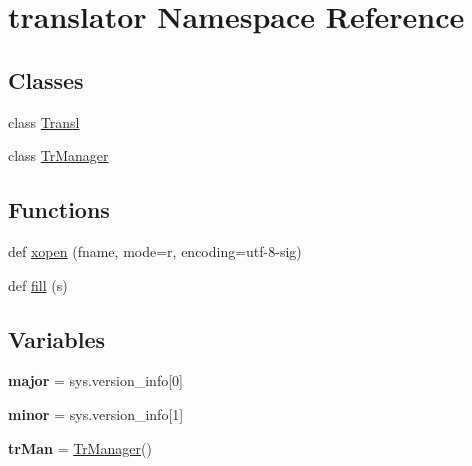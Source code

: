 \hypertarget{namespacetranslator}{}\section{translator Namespace Reference}
\label{namespacetranslator}
\subsection*{Classes}
\begin{DoxyCompactItemize}
\item 
class \mbox{\hyperlink{classtranslator_1_1_transl}{Transl}}
\item 
class \mbox{\hyperlink{classtranslator_1_1_tr_manager}{Tr\+Manager}}
\end{DoxyCompactItemize}
\subsection*{Functions}
\begin{DoxyCompactItemize}
\item 
def \mbox{\hyperlink{namespacetranslator_af67a3c62e84dd7699326522b41955c86}{xopen}} (fname, mode=\textquotesingle{}r\textquotesingle{}, encoding=\textquotesingle{}utf-\/8-\/sig\textquotesingle{})
\item 
def \mbox{\hyperlink{namespacetranslator_ab1f88f7e883aa197f4f24466397ca1bc}{fill}} (s)
\end{DoxyCompactItemize}
\subsection*{Variables}
\begin{DoxyCompactItemize}
\item 
\mbox{\label{namespacetranslator_a819a35a0f3635b885b2a397130b39605}} 
{\bfseries major} = sys.\+version\+\_\+info\mbox{[}0\mbox{]}
\item 
\mbox{\label{namespacetranslator_a02e60a00ab6f7fb0be12a26e5470e872}} 
{\bfseries minor} = sys.\+version\+\_\+info\mbox{[}1\mbox{]}
\item 
\mbox{\label{namespacetranslator_a50d18ec636a9ecc3ca027045540fea53}} 
{\bfseries tr\+Man} = \mbox{\hyperlink{classtranslator_1_1_tr_manager}{Tr\+Manager}}()
\end{DoxyCompactItemize}


